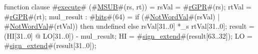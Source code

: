 function clause #\hyperref[zexecute]{execute}# (#\hyperref[zMSUB]{MSUB}#(rs, rt)) =
  {
    rsVal = #\hyperref[zrGPR]{rGPR}#(rs);
    rtVal = #\hyperref[zrGPR]{rGPR}#(rt);
    mul_result : #\hyperref[zbits]{bits}#(64) = if (#\hyperref[zNotWordVal]{NotWordVal}#(rsVal) | #\hyperref[zNotWordVal]{NotWordVal}#(rtVal)) then
        undefined
      else
	rsVal[31..0] *_s rtVal[31..0];
    result = (HI[31..0] @ LO[31..0]) - mul_result;
    HI = #\hyperref[zsignzyextend]{sign\_extend}#(result[63..32]);
    LO = #\hyperref[zsignzyextend]{sign\_extend}#(result[31..0]);
  }

